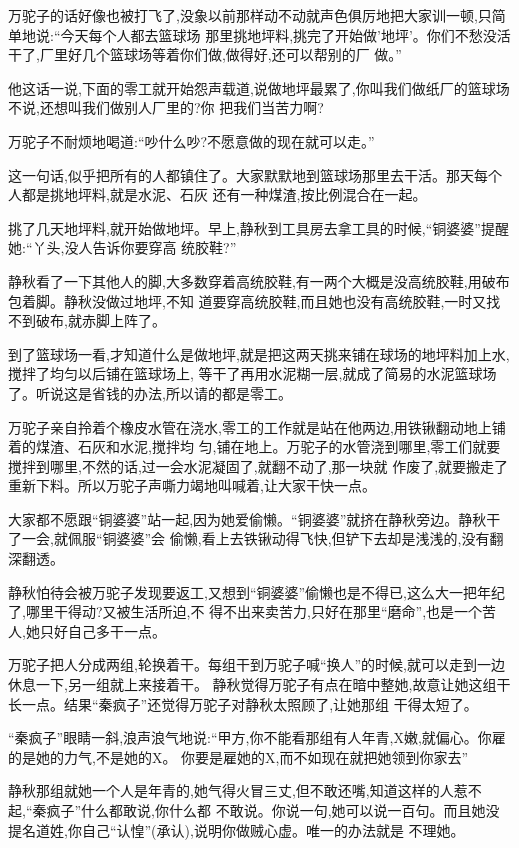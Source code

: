 ﻿\documentclass[12pt]{article}
\begin{document}
万驼子的话好像也被打飞了,没象以前那样动不动就声色俱厉地把大家训一顿,只简单地说:``今天每个人都去篮球场
那里挑地坪料,挑完了开始做'地坪'。你们不愁没活干了,厂里好几个篮球场等着你们做,做得好,还可以帮别的厂
做。''

他这话一说,下面的零工就开始怨声载道,说做地坪最累了,你叫我们做纸厂的篮球场不说,还想叫我们做别人厂里的?你
把我们当苦力啊?

万驼子不耐烦地喝道:``吵什么吵?不愿意做的现在就可以走。''

这一句话,似乎把所有的人都镇住了。大家默默地到篮球场那里去干活。那天每个人都是挑地坪料,就是水泥、石灰
还有一种煤渣,按比例混合在一起。

挑了几天地坪料,就开始做地坪。早上,静秋到工具房去拿工具的时候,``铜婆婆''提醒她:``丫头,没人告诉你要穿高
统胶鞋?''

静秋看了一下其他人的脚,大多数穿着高统胶鞋,有一两个大概是没高统胶鞋,用破布包着脚。静秋没做过地坪,不知
道要穿高统胶鞋,而且她也没有高统胶鞋,一时又找不到破布,就赤脚上阵了。

到了篮球场一看,才知道什么是做地坪,就是把这两天挑来铺在球场的地坪料加上水,搅拌了均匀以后铺在篮球场上,
等干了再用水泥糊一层,就成了简易的水泥篮球场了。听说这是省钱的办法,所以请的都是零工。

万驼子亲自拎着个橡皮水管在浇水,零工的工作就是站在他两边,用铁锹翻动地上铺着的煤渣、石灰和水泥,搅拌均
匀,铺在地上。万驼子的水管浇到哪里,零工们就要搅拌到哪里,不然的话,过一会水泥凝固了,就翻不动了,那一块就
作废了,就要搬走了重新下料。所以万驼子声嘶力竭地叫喊着,让大家干快一点。

大家都不愿跟``铜婆婆''站一起,因为她爱偷懒。``铜婆婆''就挤在静秋旁边。静秋干了一会,就佩服``铜婆婆''会
偷懒,看上去铁锹动得飞快,但铲下去却是浅浅的,没有翻深翻透。

静秋怕待会被万驼子发现要返工,又想到``铜婆婆''偷懒也是不得已,这么大一把年纪了,哪里干得动?又被生活所迫,不
得不出来卖苦力,只好在那里``磨命'',也是一个苦人,她只好自己多干一点。

万驼子把人分成两组,轮换着干。每组干到万驼子喊``换人''的时候,就可以走到一边休息一下,另一组就上来接着干。
静秋觉得万驼子有点在暗中整她,故意让她这组干长一点。结果``秦疯子''还觉得万驼子对静秋太照顾了,让她那组
干得太短了。

``秦疯子''眼睛一斜,浪声浪气地说:``甲方,你不能看那组有人年青,X嫩,就偏心。你雇的是她的力气,不是她的X。
你要是雇她的X,而不如现在就把她领到你家去\myrule ''

静秋那组就她一个人是年青的,她气得火冒三丈,但不敢还嘴,知道这样的人惹不起,``秦疯子''什么都敢说,你什么都
不敢说。你说一句,她可以说一百句。而且她没提名道姓,你自己``认惶''(承认),说明你做贼心虚。唯一的办法就是
不理她。
\end{document}
